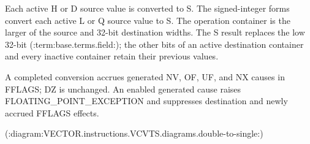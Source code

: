 Each active H or D source value is converted to S. The signed-integer forms
convert each active L or Q source value to S. The operation container is the
larger of the source and 32-bit destination widths. The S result replaces the
low 32-bit (:term:base.terms.field:); the other bits of an active destination container and every
inactive container retain their previous values.

A completed conversion accrues generated NV, OF, UF, and NX causes in FFLAGS;
DZ is unchanged. An enabled generated cause raises FLOATING\_POINT\_EXCEPTION and
suppresses destination and newly accrued FFLAGS effects.

(:diagram:VECTOR.instructions.VCVTS.diagrams.double-to-single:)
